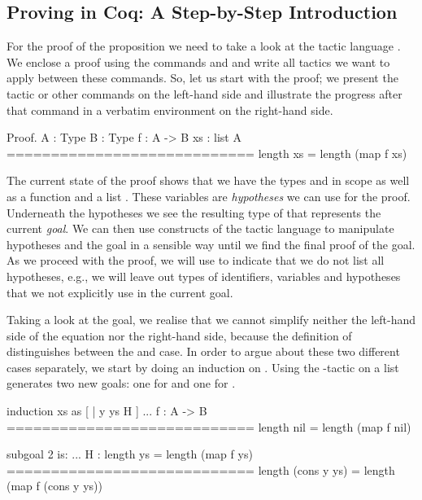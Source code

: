 \subsection{Proving in Coq: A Step-by-Step Introduction}
For the proof of the proposition  we need to take a look at the tactic language .
We enclose a proof using the commands  and  and write all tactics we want to apply between these commands.
So, let us start with the proof; we present the tactic or other commands on the left-hand side and illustrate the progress after that command in a verbatim environment on the right-hand side.

\begin{cproof}{Proof.}
  A : Type
  B : Type
  f : A -> B
  xs : list A
  ============================
  length xs = length (map f xs)
\end{cproof}

The current state of the proof shows that we have the types  and  in scope as well as a function  and a list .
These variables are \emph{hypotheses} we can use for the proof.
Underneath the hypotheses we see the resulting type of  that represents the current \emph{goal}.
We can then use constructs of the tactic language to manipulate hypotheses and the goal in a sensible way until we find the final proof of the goal.
As we proceed with the proof, we will use  to indicate that we do not list all hypotheses, e.g., we will leave out types of identifiers, variables and hypotheses that we not explicitly use in the current goal.

Taking a look at the goal, we realise that we cannot simplify neither the left-hand side of the equation nor the right-hand side, because the definition of  distinguishes between the  and  case.
In order to argue about these two different cases separately, we start by doing an induction on .
Using the -tactic on a list generates two new goals: one for  and one for .

\begin{cproof}{induction xs as [ | y ys H ]}
  ...
  f : A -> B
  ============================
  length nil = length (map f nil)

subgoal 2 is:
  ...
  H : length ys = length (map f ys)
  ============================
  length (cons y ys) =
  length (map f (cons y ys))
\end{cproof}

